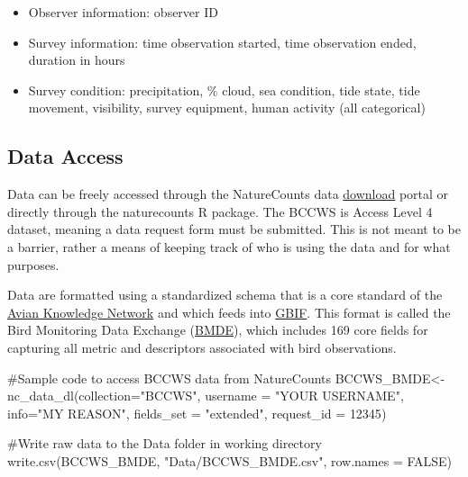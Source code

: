 \documentclass[
  letterpaper,
  DIV=11,
  numbers=noendperiod]{scrreprt}
\newenvironment{Shaded}{\begin{snugshade}}{\end{snugshade}}
\newcommand{\AttributeTok}[1]{\textcolor[rgb]{0.40,0.45,0.13}{#1}}
\newcommand{\CommentTok}[1]{\textcolor[rgb]{0.37,0.37,0.37}{#1}}
\newcommand{\ConstantTok}[1]{\textcolor[rgb]{0.56,0.35,0.01}{#1}}
\newcommand{\DecValTok}[1]{\textcolor[rgb]{0.68,0.00,0.00}{#1}}
\newcommand{\FunctionTok}[1]{\textcolor[rgb]{0.28,0.35,0.67}{#1}}
\newcommand{\NormalTok}[1]{\textcolor[rgb]{0.00,0.23,0.31}{#1}}
\newcommand{\OtherTok}[1]{\textcolor[rgb]{0.00,0.23,0.31}{#1}}
\newcommand{\StringTok}[1]{\textcolor[rgb]{0.13,0.47,0.30}{#1}}
\begin{document}
\begin{itemize}
\item
  Observer information: observer ID
\item
  Survey information: time observation started, time observation ended,
  duration in hours
\item
  Survey condition: precipitation, \% cloud, sea condition, tide state,
  tide movement, visibility, survey equipment, human activity (all
  categorical)
\end{itemize}

\subsection{Data Access}\label{data-access}

Data can be freely accessed through the NatureCounts data
\href{https://naturecounts.ca/nc/default/searchquery.jsp}{download}
portal or directly through the naturecounts R package. The BCCWS is
Access Level 4 dataset, meaning a data request form must be submitted.
This is not meant to be a barrier, rather a means of keeping track of
who is using the data and for what purposes.

Data are formatted using a standardized schema that is a core standard
of the \href{https://avianknowledge.net/}{Avian Knowledge Network} and
which feeds into \href{https://www.gbif.org/}{GBIF}. This format is
called the Bird Monitoring Data Exchange
(\href{https://naturecounts.ca/nc/default/nc_bmde.jsp}{BMDE}), which
includes 169 core fields for capturing all metric and descriptors
associated with bird observations.

\begin{Shaded}
\begin{Highlighting}[]
\CommentTok{\#Sample code to access BCCWS data from NatureCounts}
\NormalTok{ BCCWS\_BMDE}\OtherTok{\textless{}{-}}\FunctionTok{nc\_data\_dl}\NormalTok{(}\AttributeTok{collection=}\StringTok{"BCCWS"}\NormalTok{, }\AttributeTok{username =} \StringTok{"YOUR USERNAME"}\NormalTok{, }\AttributeTok{info=}\StringTok{"MY REASON"}\NormalTok{, }\AttributeTok{fields\_set =} \StringTok{"extended"}\NormalTok{, }\AttributeTok{request\_id =} \DecValTok{12345}\NormalTok{)}

\CommentTok{\#Write raw data to the \textasciigrave{}Data\textasciigrave{} folder in working directory}
\FunctionTok{write.csv}\NormalTok{(BCCWS\_BMDE, }\StringTok{"Data/BCCWS\_BMDE.csv"}\NormalTok{, }\AttributeTok{row.names =} \ConstantTok{FALSE}\NormalTok{)}
\end{Highlighting}
\end{Shaded}
\end{document}
